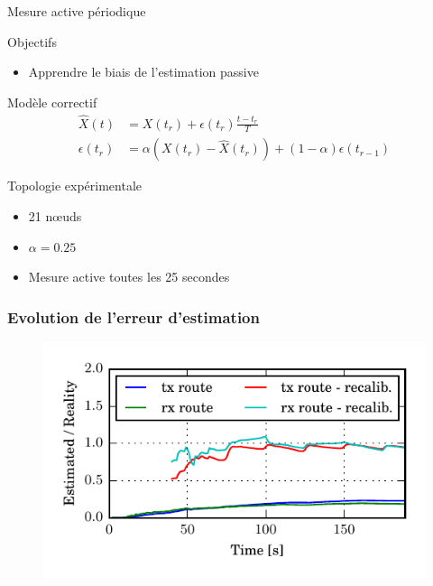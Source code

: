 \begin{frame}{Mesure active périodique}
  \begin{block}{Objectifs}
    \begin{itemize}
      \item Apprendre le biais de l'estimation passive
    \end{itemize}
  \end{block}
  \begin{alertblock}{Modèle correctif}
    \begin{align}
      \widehat{X}(t) &= X(t_r) + \epsilon(t_r)\frac{t - t_r}{T}\\
      \epsilon(t_r) &= \alpha (X(t_r) - \widehat{X}(t_r)) + (1 - \alpha)\epsilon(t_{r-1})
      \label{supervision:eqn:bias}
    \end{align}
  \end{alertblock}
  \begin{block}{Topologie expérimentale}
    \begin{itemize}
      \item 21 nœuds
      \item $\alpha = 0.25$
      \item Mesure active toutes les 25 secondes
    \end{itemize}
  \end{block}
\end{frame}

\begin{frame}\frametitle{Evolution de l'erreur d'estimation}
  \begin{figure}[ht]
    \centering
    \includegraphics[width=\textwidth]{figures/ratio_recalibration_global.pdf}
  \end{figure}
\end{frame}

